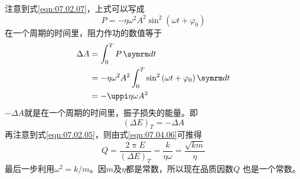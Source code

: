 注意到式\eqref{eqn:07.02.07}，上式可以写成
\begin{equation*}
  P = - \eta \omega ^ { 2 } A ^ { 2 } \sin ^ { 2 } \left( \omega t + \varphi _ { 0 } \right)
\end{equation*}
在一个周期的时间里，阻力作功的数值等于
\begin{equation}\label{eqn:07.04.06}
  \begin{aligned}
    \Delta A & = \int _ { 0 } ^ { T } P \dif t                                                                                      \\
             & = - \eta \omega ^ { 2 } A ^ { 2 } \int _ { 0 } ^ { T } \sin ^ { 2 } \left( \omega t + \varphi _ { 0 } \right) \dif t \\
             & = - \uppi \eta \omega A ^ { 2 }
  \end{aligned}
\end{equation}
$ - \Delta A $就是在一个周期的时间里，振子损失的能量。即
\begin{equation*}
  \left( \Delta E \right) _ { T } = - \Delta A
\end{equation*}
再注意到式\eqref{eqn:07.02.05}，则由式\eqref{eqn:07.04.06}可推得
\begin{equation}\label{eqn:07.04.07}
  Q = \frac { 2 \uppi E } { \left( \Delta E \right) _ { T } } = \frac { k } { \eta \omega } = \frac { \sqrt { k m } } { \eta }
\end{equation}
最后一步利用$  \omega ^ { 2 } = k / m   $。因$ m $及$ \eta $都是常数，所以现在品质因数$ Q $
也是一个常数。

